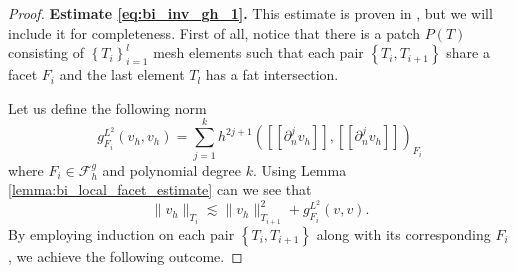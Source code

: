 \documentclass[11pt]{article}
\theoremstyle{remark}
\newcommand{\jump}[1]{\left[\!\left[ #1 \right]\!\right]}
\numberwithin{equation}{section}
\begin{document}
\begin{proof}
        \textbf{Estimate \eqref{eq:bi_inv_gh_1}.}
        This estimate is proven in \cite[Lemma 2.20]{gurkan2019stabilized}, but we will include it for completeness.
            First of all, notice that there is a patch $P(T) $ consisting of $\left\{ T_{i} \right\}_{i=1}^{l} $ mesh elements such that each pair $ \left\{ T_{i}, T_{i+1} \right\} $ share a facet $F_{i}$ and the last element $T_{l}$ has a fat intersection.

            Let us define the following norm
            \begin{equation}
            g_{F_{i}}^{L^{2}}( v_{h},v_{h})  = \sum_{j=1}^{k} h^{2j+1}( \jump{ \partial ^{j}_{n}v_{h} }, \jump{ \partial ^{j}_{n}v_{h} }    )_{F_{i} }
            \end{equation}
            where $F_{i} \in  \mathcal{F} ^{g}_{h}$ and polynomial degree $ k$. Using Lemma \ref{lemma:bi_local_facet_estimate} can we see that
            \begin{equation}
            \| v_{h} \|_{ T_{i} }^{  } \lesssim \| v_{h} \|_{ T_{i+1} }^{ 2 } + g_{F_{i}}^{L^{2}}( v,v).
            \end{equation}
By employing induction on each pair $\left\{ T_{i}, T_{i+1} \right\}$ along with its corresponding $F_{i}$, we achieve the following outcome.


\end{proof}
\end{document}
